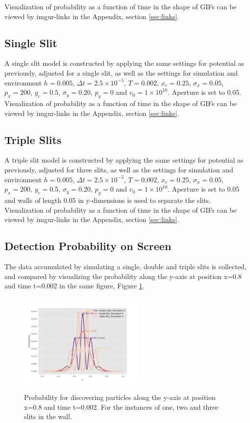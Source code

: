 \documentclass[10pt, nofootinbib, twocolumn]{revtex4-1}
\begin{document}
Visualization of probability as a function of time in the shape of GIFs can be viewed by imgur-links in the Appendix, section \ref{sec:links}.



\subsection{Single Slit}
A single slit model is constructed by applying the same settings for potential as previously, adjusted for a single slit, as well as the settings for simulation and environment $h = 0.005$, $\Delta t = 2.5\times10^{-5}$, $T = 0.002$, $x_c = 0.25$, $\sigma_x = 0.05$, $p_x = 200$, $y_c = 0.5$, $\sigma_y = 0.20$, $p_y = 0$ and $v_0 = 1\times10^{10}$. Aperture is set to 0.05. Visualization of probability as a function of time in the shape of GIFs can be viewed by imgur-links in the Appendix, section \ref{sec:links}.



\subsection{Triple Slits}
A triple slit model is constructed by applying the same settings for potential as previously, adjusted for three slits, as well as the settings for simulation and environment $h = 0.005$, $\Delta t = 2.5\times10^{-5}$, $T = 0.002$, $x_c = 0.25$, $\sigma_x = 0.05$, $p_x = 200$, $y_c = 0.5$, $\sigma_y = 0.20$, $p_y = 0$ and $v_0 = 1\times10^{10}$. Aperture is set to 0.05 and walls of length 0.05 in y-dimensions is used to separate the slits. Visualization of probability as a function of time in the shape of GIFs can be viewed by imgur-links in the Appendix, section \ref{sec:links}.



\subsection{Detection Probability on Screen}
The data accumulated by simulating a single, double and triple slits is collected, and compared by visualizing the probability along the y-axis at position x=0.8 and time t=0.002 in the same figure, Figure \ref{fig:comparison}. 

\begin{figure}[H]
    \caption{Probability for discovering particles along the y-axis at position x=0.8 and time t=0.002. For the instances of one, two and three slits in the wall.}
    \centering
    \includegraphics[width = 0.55\textwidth]{figures/wall.pdf} 
    \label{fig:comparison}
\end{figure}
\end{document}
